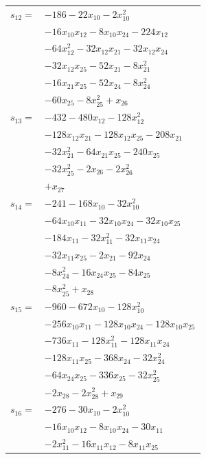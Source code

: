 \begin{longtable}{@{}r@{\;}l@{}}
\(s_{12}=\) & \(\displaystyle -186 -22x_{10} -2x_{10}^{2}\) \\
 & \(\displaystyle -16x_{10}x_{12} -8x_{10}x_{24} -224x_{12}\) \\
 & \(\displaystyle -64x_{12}^{2} -32x_{12}x_{21} -32x_{12}x_{24}\) \\
 & \(\displaystyle -32x_{12}x_{25} -52x_{21} -8x_{21}^{2}\) \\
 & \(\displaystyle -16x_{21}x_{25} -52x_{24} -8x_{24}^{2}\) \\
 & \(\displaystyle -60x_{25} -8x_{25}^{2} +x_{26}\) \\[3pt]
\(s_{13}=\) & \(\displaystyle -432 -480x_{12} -128x_{12}^{2}\) \\
 & \(\displaystyle -128x_{12}x_{21} -128x_{12}x_{25} -208x_{21}\) \\
 & \(\displaystyle -32x_{21}^{2} -64x_{21}x_{25} -240x_{25}\) \\
 & \(\displaystyle -32x_{25}^{2} -2x_{26} -2x_{26}^{2}\) \\
 & \(\displaystyle +x_{27}\) \\[3pt]
\(s_{14}=\) & \(\displaystyle -241 -168x_{10} -32x_{10}^{2}\) \\
 & \(\displaystyle -64x_{10}x_{11} -32x_{10}x_{24} -32x_{10}x_{25}\) \\
 & \(\displaystyle -184x_{11} -32x_{11}^{2} -32x_{11}x_{24}\) \\
 & \(\displaystyle -32x_{11}x_{25} -2x_{21} -92x_{24}\) \\
 & \(\displaystyle -8x_{24}^{2} -16x_{24}x_{25} -84x_{25}\) \\
 & \(\displaystyle -8x_{25}^{2} +x_{28}\) \\[3pt]
\(s_{15}=\) & \(\displaystyle -960 -672x_{10} -128x_{10}^{2}\) \\
 & \(\displaystyle -256x_{10}x_{11} -128x_{10}x_{24} -128x_{10}x_{25}\) \\
 & \(\displaystyle -736x_{11} -128x_{11}^{2} -128x_{11}x_{24}\) \\
 & \(\displaystyle -128x_{11}x_{25} -368x_{24} -32x_{24}^{2}\) \\
 & \(\displaystyle -64x_{24}x_{25} -336x_{25} -32x_{25}^{2}\) \\
 & \(\displaystyle -2x_{28} -2x_{28}^{2} +x_{29}\) \\[3pt]
\(s_{16}=\) & \(\displaystyle -276 -30x_{10} -2x_{10}^{2}\) \\
 & \(\displaystyle -16x_{10}x_{12} -8x_{10}x_{24} -30x_{11}\) \\
 & \(\displaystyle -2x_{11}^{2} -16x_{11}x_{12} -8x_{11}x_{25}\) \\

\end{longtable}
